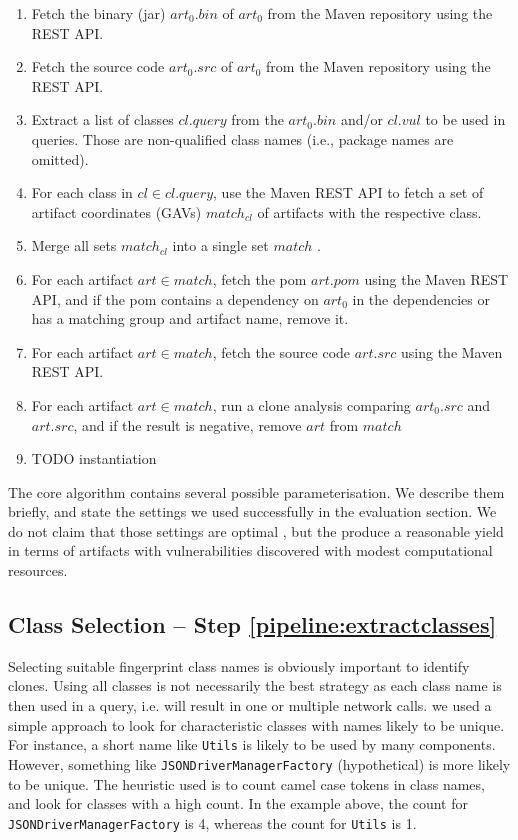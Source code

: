 \documentclass{article}
\begin{document}
\begin{enumerate}
	\item Fetch the binary (jar) $art_0.bin$  of $art_0$ from the Maven repository using the REST API.
	\item \label{pipeline:fetchsources} Fetch the source code  $art_0.src$  of $art_0$ from the Maven repository using the REST API.
	\item \label{pipeline:extractclasses} Extract a list of classes $cl.query$  from the  $art_0.bin$ and/or $cl.vul$ to be used in queries. Those are non-qualified class names (i.e., package names are omitted). 
	\item For each class in $cl \in cl.query$, use the Maven REST API to fetch a set of artifact coordinates (GAVs) $match_{cl}$  of artifacts with the respective class. 
	\item \label{pipeline:classconsolidation} Merge all sets $match_{cl}$ into a single set $match$ .
	\item  \label{pipeline:query}  For each artifact $art  \in match$, fetch the pom $art.pom$ using the Maven REST API, and if the pom contains a dependency on $art_0$ in the dependencies or has a matching group and artifact name, remove it. 
	\item For each artifact $art  \in match$, fetch the source code $art.src$ using the Maven REST API. 
	\item For each artifact $art  \in match$, run a clone analysis comparing $art_0.src$ and $art.src$, and if the result is negative, remove $art$ from $match$
	\item TODO instantiation
	
\end{enumerate}


The core algorithm contains several possible parameterisation. We describe them briefly, and state the settings we used successfully in the evaluation section. We do not claim that those settings are optimal , but the produce a reasonable yield in terms of artifacts with vulnerabilities discovered with modest computational resources.




\subsection {Class Selection -- Step \ref{pipeline:extractclasses}}

Selecting suitable fingerprint class names is obviously important to identify clones. Using all classes is not necessarily the best strategy as each class name is then used in a query, i.e. will result in one or multiple network calls. we used a simple approach to look for characteristic classes with names likely to be unique. For instance, a short name like \texttt{Utils} is likely to be used by many components. However, something like \texttt{JSONDriverManagerFactory} (hypothetical) is more likely to be unique. The heuristic used is to count camel case tokens in class names, and look for classes with a high count. In the example above, the count for \texttt{JSONDriverManagerFactory} is 4, whereas the count for \texttt{Utils} is 1.
\end{document}
